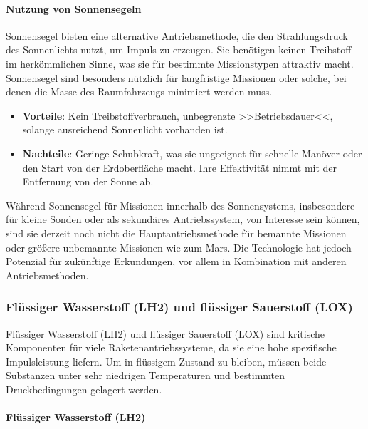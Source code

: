 \documentclass{vorlage-design-main}
\begin{document}
\hypertarget{nutzung-von-sonnensegeln}{%
\paragraph{Nutzung von Sonnensegeln}\label{nutzung-von-sonnensegeln}}

Sonnensegel bieten eine alternative Antriebsmethode, die den
Strahlungsdruck des Sonnenlichts nutzt, um Impuls zu erzeugen. Sie
benötigen keinen Treibstoff im herkömmlichen Sinne, was sie für
bestimmte Missionstypen attraktiv macht. Sonnensegel sind besonders
nützlich für langfristige Missionen oder solche, bei denen die Masse des
Raumfahrzeugs minimiert werden muss.

\begin{itemize}

\item
  \textbf{Vorteile}: Kein Treibstoffverbrauch, unbegrenzte
  >>Betriebsdauer<<, solange ausreichend Sonnenlicht vorhanden ist.
\item
  \textbf{Nachteile}: Geringe Schubkraft, was sie ungeeignet für
  schnelle Manöver oder den Start von der Erdoberfläche macht. Ihre
  Effektivität nimmt mit der Entfernung von der Sonne ab.
\end{itemize}

Während Sonnensegel für Missionen innerhalb des Sonnensystems,
insbesondere für kleine Sonden oder als sekundäres Antriebssystem, von
Interesse sein können, sind sie derzeit noch nicht die
Hauptantriebsmethode für bemannte Missionen oder größere unbemannte
Missionen wie zum Mars. Die Technologie hat jedoch Potenzial für
zukünftige Erkundungen, vor allem in Kombination mit anderen
Antriebsmethoden.

\hypertarget{fluxfcssiger-wasserstoff-lh2-und-fluxfcssiger-sauerstoff-lox}{%
\subsubsection{Flüssiger Wasserstoff (LH2) und flüssiger Sauerstoff
(LOX)}\label{fluessiger-wasserstoff-lh2-und-fluessiger-sauerstoff-lox}}

Flüssiger Wasserstoff (LH2) und flüssiger Sauerstoff (LOX) sind
kritische Komponenten für viele Raketenantriebssysteme, da sie eine hohe
spezifische Impulsleistung liefern. Um in flüssigem Zustand zu bleiben,
müssen beide Substanzen unter sehr niedrigen Temperaturen und bestimmten
Druckbedingungen gelagert werden.

\hypertarget{fluxfcssiger-wasserstoff-lh2}{%
\paragraph{Flüssiger Wasserstoff
(LH2)}\label{fluessiger-wasserstoff-lh2}}
\end{document}
